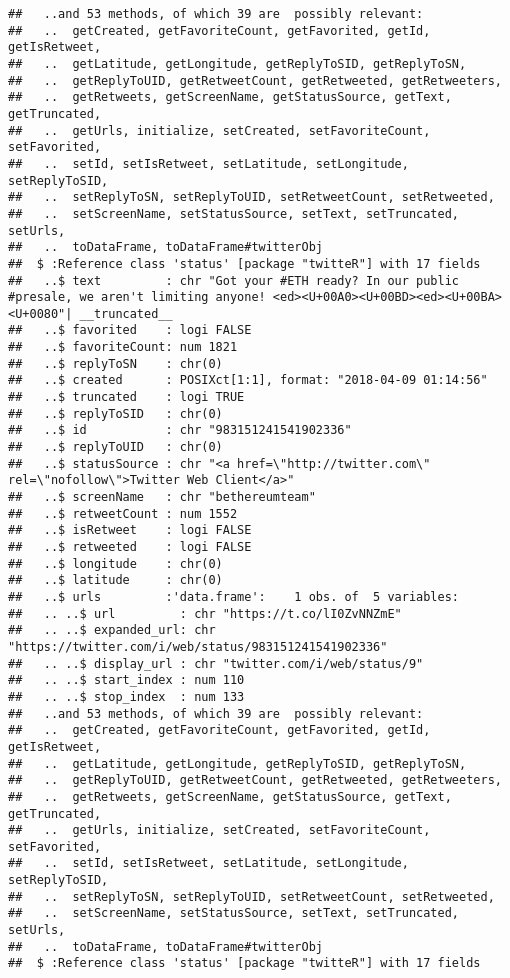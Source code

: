 \documentclass[]{article}
\begin{document}
\begin{verbatim}
##   ..and 53 methods, of which 39 are  possibly relevant:
##   ..  getCreated, getFavoriteCount, getFavorited, getId, getIsRetweet,
##   ..  getLatitude, getLongitude, getReplyToSID, getReplyToSN,
##   ..  getReplyToUID, getRetweetCount, getRetweeted, getRetweeters,
##   ..  getRetweets, getScreenName, getStatusSource, getText, getTruncated,
##   ..  getUrls, initialize, setCreated, setFavoriteCount, setFavorited,
##   ..  setId, setIsRetweet, setLatitude, setLongitude, setReplyToSID,
##   ..  setReplyToSN, setReplyToUID, setRetweetCount, setRetweeted,
##   ..  setScreenName, setStatusSource, setText, setTruncated, setUrls,
##   ..  toDataFrame, toDataFrame#twitterObj
##  $ :Reference class 'status' [package "twitteR"] with 17 fields
##   ..$ text         : chr "Got your #ETH ready? In our public #presale, we aren't limiting anyone! <ed><U+00A0><U+00BD><ed><U+00BA><U+0080"| __truncated__
##   ..$ favorited    : logi FALSE
##   ..$ favoriteCount: num 1821
##   ..$ replyToSN    : chr(0) 
##   ..$ created      : POSIXct[1:1], format: "2018-04-09 01:14:56"
##   ..$ truncated    : logi TRUE
##   ..$ replyToSID   : chr(0) 
##   ..$ id           : chr "983151241541902336"
##   ..$ replyToUID   : chr(0) 
##   ..$ statusSource : chr "<a href=\"http://twitter.com\" rel=\"nofollow\">Twitter Web Client</a>"
##   ..$ screenName   : chr "bethereumteam"
##   ..$ retweetCount : num 1552
##   ..$ isRetweet    : logi FALSE
##   ..$ retweeted    : logi FALSE
##   ..$ longitude    : chr(0) 
##   ..$ latitude     : chr(0) 
##   ..$ urls         :'data.frame':    1 obs. of  5 variables:
##   .. ..$ url         : chr "https://t.co/lI0ZvNNZmE"
##   .. ..$ expanded_url: chr "https://twitter.com/i/web/status/983151241541902336"
##   .. ..$ display_url : chr "twitter.com/i/web/status/9"
##   .. ..$ start_index : num 110
##   .. ..$ stop_index  : num 133
##   ..and 53 methods, of which 39 are  possibly relevant:
##   ..  getCreated, getFavoriteCount, getFavorited, getId, getIsRetweet,
##   ..  getLatitude, getLongitude, getReplyToSID, getReplyToSN,
##   ..  getReplyToUID, getRetweetCount, getRetweeted, getRetweeters,
##   ..  getRetweets, getScreenName, getStatusSource, getText, getTruncated,
##   ..  getUrls, initialize, setCreated, setFavoriteCount, setFavorited,
##   ..  setId, setIsRetweet, setLatitude, setLongitude, setReplyToSID,
##   ..  setReplyToSN, setReplyToUID, setRetweetCount, setRetweeted,
##   ..  setScreenName, setStatusSource, setText, setTruncated, setUrls,
##   ..  toDataFrame, toDataFrame#twitterObj
##  $ :Reference class 'status' [package "twitteR"] with 17 fields

\end{verbatim}
\end{document}
